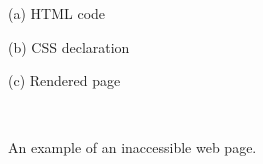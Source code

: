 \begin{figure}[h]
    \begin{minipage}[c]{.6\columnwidth}\centering
        (a) HTML code
    \end{minipage}
    \hfill
    \begin{minipage}[c]{.5\columnwidth}\centering
        (b) CSS declaration
    \end{minipage}
    \hfill    
    \begin{minipage}[c]{.85\columnwidth}\centering
        (c) Rendered page
    \end{minipage}    
    \ \\ \caption{An example of an inaccessible web page.}
    \label{fig:motivating-example}
  \end{figure}

